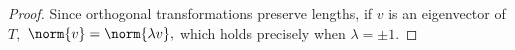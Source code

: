 \begin{proof}
    Since orthogonal transformations preserve lengths, if $v$ is an eigenvector of $T,$ $\norm{v} = \norm{\lambda v},$ which holds precisely when $\lambda = \pm 1.$
\end{proof}